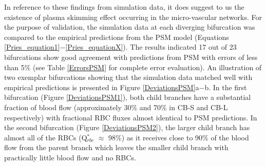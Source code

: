 \noindent In reference to these findings from simulation data, it does suggest to us the existence of plasma skimming effect occurring in the micro-vascular networks. For the purpose of validation, the simulation data at each diverging bifurcation was compared to the empirical predictions from the PSM model (Equations \ref{Pries_equation1}$-$\ref{Pries_equationX}).\cite{A.R.Pries2005Mbvi, PriesAR1990BFiM} The results indicated 17 out of 23 bifurcations show good agreement with predictions from PSM with errors of less than 5$\%$ (see Table \ref{ErrorsPSM} for complete error evaluation). An illustration of two exemplar bifurcations showing that the simulation data matched well with empirical predictions is presented in Figure \ref{DeviationsPSM}a$-$b. In the first bifurcation (Figure \ref{DeviationsPSM1}), both child branches have a substantial fraction of blood flow (approximately 30\% and 70\% in CB-S and CB-L respectively) with fractional RBC fluxes almost identical to PSM predictions. In the second bifurcation (Figure \ref{DeviationsPSM2}), the larger child branch has almost all of the RBCs (Q$^{*}_{rbc}$ $\approx$ 98\%) as it receives close to 90\% of the blood flow from the parent branch which leaves the smaller child branch with practically little blood flow and no RBCs. 

